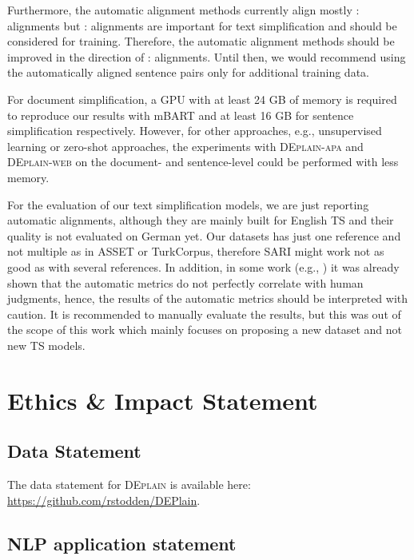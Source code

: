 \documentclass[11pt]{article}
\begin{document}
Furthermore, the automatic alignment methods currently align mostly : alignments but : alignments are important for text simplification and should be considered for training. Therefore, the automatic alignment methods should be improved in the direction of : alignments. Until then, we would recommend using the automatically aligned sentence pairs only for additional training data.\par
For document simplification, a GPU with at least 24 GB of memory is required to reproduce our results with mBART and at least 16 GB for sentence simplification respectively. However, for other approaches, e.g., unsupervised learning or zero-shot approaches, the experiments with \textsc{DEplain-apa} and \textsc{DEplain-web} on the document- and sentence-level could be performed with less memory. 

For the evaluation of our text simplification models, we are just reporting automatic alignments, although they are mainly built for English TS and their quality is not evaluated on German yet. 
Our datasets has just one reference and not multiple as in ASSET or TurkCorpus, therefore SARI might work not as good as with several references. 
In addition, in some work (e.g., \citet{alva-manchego-etal-2021-un}) it was already shown that the automatic metrics do not perfectly correlate with human judgments, hence, the results of the automatic metrics should be interpreted with caution. It is recommended to manually evaluate the results, but this was out of the scope of this work which mainly focuses on proposing a new dataset and not new TS models.



\newpage
\section*{Ethics \& Impact Statement}
\subsection*{Data Statement}
The data statement for \textsc{DEplain} is available here: \url{https://github.com/rstodden/DEPlain}. 


\subsection*{NLP application statement}
\end{document}
